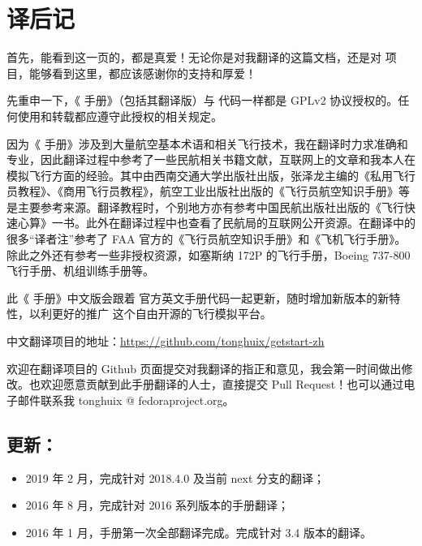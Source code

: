 \newpage
\section{译后记}

首先，能看到这一页的，都是真爱！无论你是对我翻译的这篇文档，还是对 \FlightGear{} 项目，能够看到这里，都应该感谢你的支持和厚爱！

先重申一下，《\FlightGear{} 手册》（包括其翻译版）与 \FligtGear{} 代码一样都是 GPLv2 协议授权的。任何使用和转载都应遵守此授权的相关规定。

因为《\FlightGear{} 手册》涉及到大量航空基本术语和相关飞行技术，我在翻译时力求准确和专业，因此翻译过程中参考了一些民航相关书籍文献，互联网上的文章和我本人在模拟飞行方面的经验。其中由西南交通大学出版社出版，张泽龙主编的《私用飞行员教程》、《商用飞行员教程》，航空工业出版社出版的《飞行员航空知识手册》等是主要参考来源。翻译教程时，个别地方亦有参考中国民航出版社出版的《飞行快速心算》一书。此外在翻译过程中也查看了民航局的互联网公开资源。在翻译中的很多“译者注”参考了 FAA 官方的《飞行员航空知识手册》和《飞机飞行手册》。除此之外还有参考一些非授权资源，如塞斯纳 172P 的飞行手册，Boeing 737-800 飞行手册、机组训练手册等。

此《\FlightGear{} 手册》中文版会跟着 \FlightGear{} 官方英文手册代码一起更新，随时增加新版本的新特性，以利更好的推广 \FlightGear{} 这个自由开源的飞行模拟平台。

中文翻译项目的地址：\url{https://github.com/tonghuix/getstart-zh}

欢迎在翻译项目的 Github 页面提交对我翻译的指正和意见，我会第一时间做出修改。也欢迎愿意贡献到此手册翻译的人士，直接提交 Pull Request！也可以通过电子邮件联系我 tonghuix @ fedoraproject.org。

\subsection*{更新：}
\begin{itemize}
\item 2019 年 2 月，完成针对 2018.4.0 及当前 next 分支的翻译；
\item 2016 年 8 月，完成针对 2016 系列版本的手册翻译；
\item 2016 年 1 月，手册第一次全部翻译完成。完成针对 3.4 版本的翻译。
\end{itemize}


